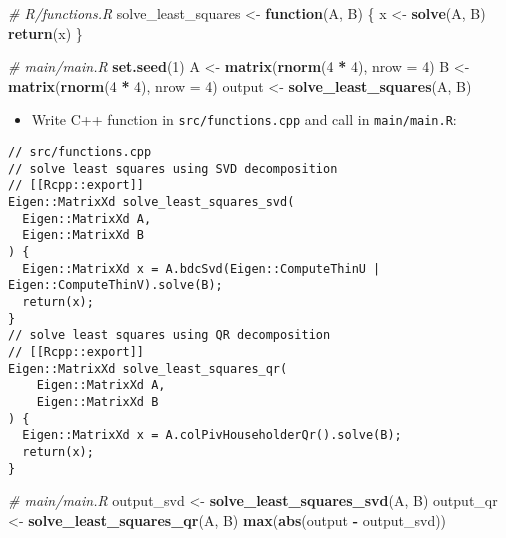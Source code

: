 \documentclass[
]{book}
\newenvironment{Shaded}{\begin{snugshade}}{\end{snugshade}}
\newcommand{\CommentTok}[1]{\textcolor[rgb]{0.56,0.35,0.01}{\textit{#1}}}
\newcommand{\ControlFlowTok}[1]{\textcolor[rgb]{0.13,0.29,0.53}{\textbf{#1}}}
\newcommand{\DataTypeTok}[1]{\textcolor[rgb]{0.13,0.29,0.53}{#1}}
\newcommand{\DecValTok}[1]{\textcolor[rgb]{0.00,0.00,0.81}{#1}}
\newcommand{\KeywordTok}[1]{\textcolor[rgb]{0.13,0.29,0.53}{\textbf{#1}}}
\newcommand{\NormalTok}[1]{#1}
\newcommand{\OperatorTok}[1]{\textcolor[rgb]{0.81,0.36,0.00}{\textbf{#1}}}
\newcommand{\StringTok}[1]{\textcolor[rgb]{0.31,0.60,0.02}{#1}}
\providecommand{\tightlist}{%
  \setlength{\itemsep}{0pt}\setlength{\parskip}{0pt}}
\begin{document}
\begin{Shaded}
\begin{Highlighting}[]
\CommentTok{# R/functions.R}
\NormalTok{solve_least_squares <-}
\StringTok{  }\ControlFlowTok{function}\NormalTok{(A, B) \{}
\NormalTok{    x <-}\StringTok{ }\KeywordTok{solve}\NormalTok{(A, B)}
    \KeywordTok{return}\NormalTok{(x)}
\NormalTok{  \}}
\end{Highlighting}
\end{Shaded}

\begin{Shaded}
\begin{Highlighting}[]
\CommentTok{# main/main.R}
\KeywordTok{set.seed}\NormalTok{(}\DecValTok{1}\NormalTok{)}
\NormalTok{A <-}\StringTok{ }\KeywordTok{matrix}\NormalTok{(}\KeywordTok{rnorm}\NormalTok{(}\DecValTok{4} \OperatorTok{*}\StringTok{ }\DecValTok{4}\NormalTok{), }\DataTypeTok{nrow =} \DecValTok{4}\NormalTok{)}
\NormalTok{B <-}\StringTok{ }\KeywordTok{matrix}\NormalTok{(}\KeywordTok{rnorm}\NormalTok{(}\DecValTok{4} \OperatorTok{*}\StringTok{ }\DecValTok{4}\NormalTok{), }\DataTypeTok{nrow =} \DecValTok{4}\NormalTok{)}
\NormalTok{output <-}\StringTok{ }\KeywordTok{solve_least_squares}\NormalTok{(A, B)}
\end{Highlighting}
\end{Shaded}

\begin{itemize}
\tightlist
\item
  Write C++ function in \texttt{src/functions.cpp} and call in \texttt{main/main.R}:
\end{itemize}

\begin{verbatim}
// src/functions.cpp
// solve least squares using SVD decomposition
// [[Rcpp::export]]
Eigen::MatrixXd solve_least_squares_svd(
  Eigen::MatrixXd A,
  Eigen::MatrixXd B
) {
  Eigen::MatrixXd x = A.bdcSvd(Eigen::ComputeThinU | Eigen::ComputeThinV).solve(B);
  return(x);
}
// solve least squares using QR decomposition
// [[Rcpp::export]]
Eigen::MatrixXd solve_least_squares_qr(
    Eigen::MatrixXd A,
    Eigen::MatrixXd B
) {
  Eigen::MatrixXd x = A.colPivHouseholderQr().solve(B);
  return(x);
}
\end{verbatim}

\begin{Shaded}
\begin{Highlighting}[]
\CommentTok{# main/main.R}
\NormalTok{output_svd <-}\StringTok{ }\KeywordTok{solve_least_squares_svd}\NormalTok{(A, B)}
\NormalTok{output_qr <-}\StringTok{ }\KeywordTok{solve_least_squares_qr}\NormalTok{(A, B)}
\KeywordTok{max}\NormalTok{(}\KeywordTok{abs}\NormalTok{(output }\OperatorTok{-}\StringTok{ }\NormalTok{output_svd))}
\end{Highlighting}
\end{Shaded}
\end{document}

